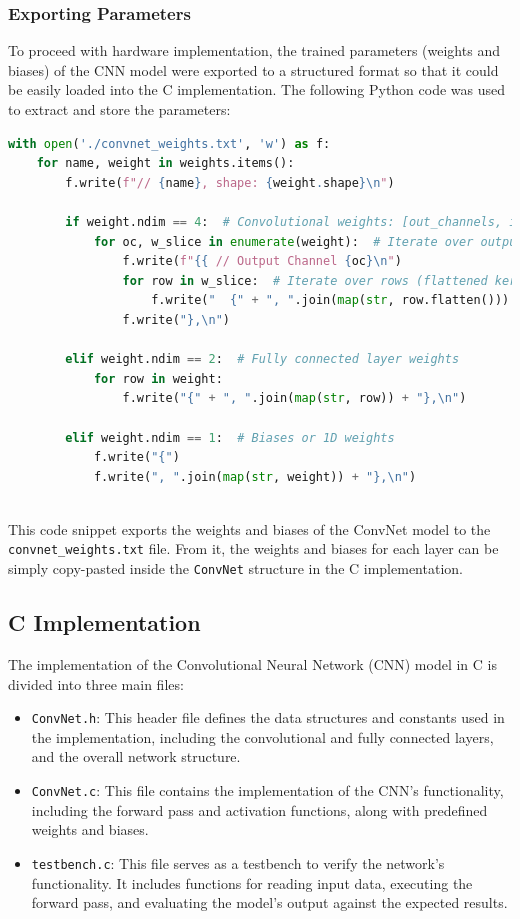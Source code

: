 \documentclass{article}
\begin{document}
\subsubsection{Exporting Parameters}
To proceed with hardware implementation, the trained parameters (weights and biases) of the CNN model were exported to a structured format so that it could be easily loaded into the C implementation.
The following Python code was used to extract and store the parameters:

\begin{lstlisting}[language=Python]
with open('./convnet_weights.txt', 'w') as f:
    for name, weight in weights.items():
        f.write(f"// {name}, shape: {weight.shape}\n")
        
        if weight.ndim == 4:  # Convolutional weights: [out_channels, in_channels, kernel_height, kernel_width]
            for oc, w_slice in enumerate(weight):  # Iterate over output channels
                f.write(f"{{ // Output Channel {oc}\n")
                for row in w_slice:  # Iterate over rows (flattened kernels)
                    f.write("  {" + ", ".join(map(str, row.flatten())) + "},\n")
                f.write("},\n")
        
        elif weight.ndim == 2:  # Fully connected layer weights
            for row in weight:
                f.write("{" + ", ".join(map(str, row)) + "},\n")
        
        elif weight.ndim == 1:  # Biases or 1D weights
            f.write("{")
            f.write(", ".join(map(str, weight)) + "},\n")
    
\end{lstlisting}

This code snippet exports the weights and biases of the ConvNet model to the \texttt{convnet\_weights.txt} file. From it, the weights and biases for each layer can be simply copy-pasted inside the \texttt{ConvNet} structure in the C implementation. 

\subsection{C Implementation}
The implementation of the Convolutional Neural Network (CNN) model in C is divided into three main files:

\begin{itemize}
    \item \texttt{ConvNet.h}: This header file defines the data structures and constants used in the implementation, including the convolutional and fully connected layers, and the overall network structure.
    \item \texttt{ConvNet.c}: This file contains the implementation of the CNN's functionality, including the forward pass and activation functions, along with predefined weights and biases.
    \item \texttt{testbench.c}: This file serves as a testbench to verify the network's functionality. It includes functions for reading input data, executing the forward pass, and evaluating the model's output against the expected results.
\end{itemize}
\end{document}
